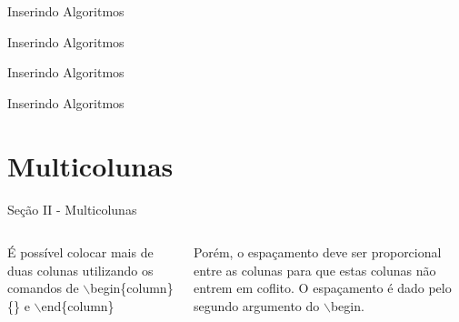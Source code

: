 \documentclass{libs/ufc_format}
\begin{document}

\begin{frame}{Inserindo Algoritmos}
    \lstset{language=Python}
    
\end{frame}

\begin{frame}{Inserindo Algoritmos}
    
\end{frame}

\begin{frame}{Inserindo Algoritmos}
    
\end{frame}

\begin{frame}{Inserindo Algoritmos}
    
\end{frame}

\section{Multicolunas}
\begin{frame}{Seção II - Multicolunas}
    \begin{columns}{}
        \begin{column}{0.5\textwidth}
            \justify
            É possível colocar mais de duas colunas utilizando os comandos de $\backslash$begin\{column\}\{\} e $\backslash$end\{column\}
        \end{column}
        \begin{column}{0.5\textwidth}
            \justify
            Porém, o espaçamento deve ser proporcional entre as colunas para que estas colunas não entrem em coflito. O espaçamento é dado pelo segundo argumento do $\backslash$begin.
        \end{column}
    \end{columns}    
\end{frame}

\end{document}
